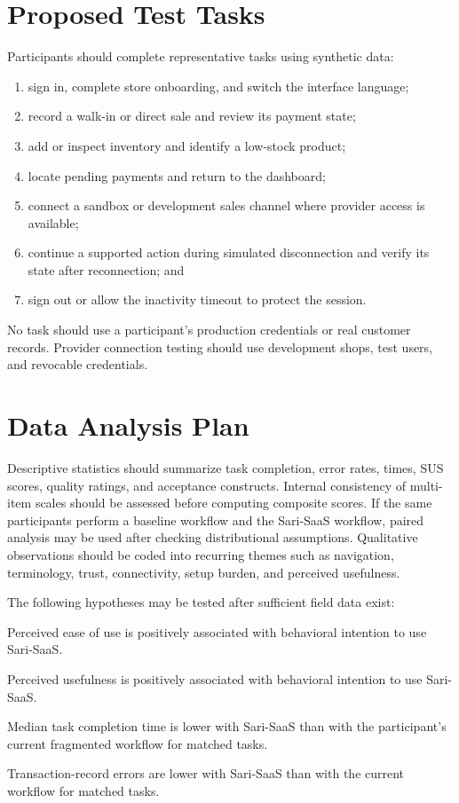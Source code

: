 \documentclass[12pt,oneside]{report}
\begin{document}
\section{Proposed Test Tasks}
Participants should complete representative tasks using synthetic data:

\begin{enumerate}
  \item sign in, complete store onboarding, and switch the interface language;
  \item record a walk-in or direct sale and review its payment state;
  \item add or inspect inventory and identify a low-stock product;
  \item locate pending payments and return to the dashboard;
  \item connect a sandbox or development sales channel where provider access is
  available;
  \item continue a supported action during simulated disconnection and verify
  its state after reconnection; and
  \item sign out or allow the inactivity timeout to protect the session.
\end{enumerate}

No task should use a participant's production credentials or real customer
records. Provider connection testing should use development shops, test users,
and revocable credentials.

\section{Data Analysis Plan}
Descriptive statistics should summarize task completion, error rates, times,
SUS scores, quality ratings, and acceptance constructs. Internal consistency of
multi-item scales should be assessed before computing composite scores. If the
same participants perform a baseline workflow and the Sari-SaaS workflow,
paired analysis may be used after checking distributional assumptions.
Qualitative observations should be coded into recurring themes such as
navigation, terminology, trust, connectivity, setup burden, and perceived
usefulness.

The following hypotheses may be tested after sufficient field data exist:

\begin{description}[leftmargin=0.45in]
  \item[H1.] Perceived ease of use is positively associated with behavioral
  intention to use Sari-SaaS.
  \item[H2.] Perceived usefulness is positively associated with behavioral
  intention to use Sari-SaaS.
  \item[H3.] Median task completion time is lower with Sari-SaaS than with the
  participant's current fragmented workflow for matched tasks.
  \item[H4.] Transaction-record errors are lower with Sari-SaaS than with the
  current workflow for matched tasks.
\end{description}
\end{document}
